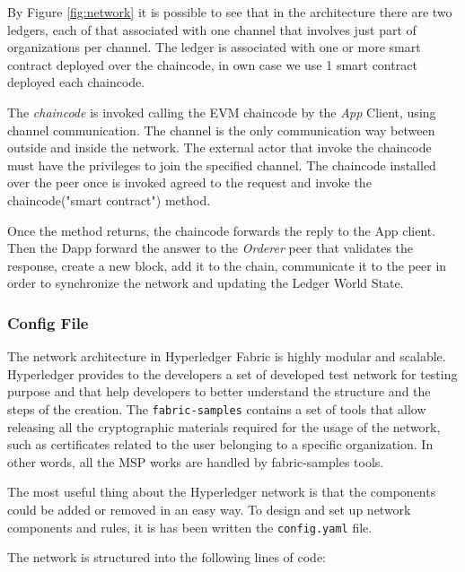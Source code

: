 By Figure \ref{fig:network} it is possible to see that in the architecture there are two ledgers, each of that 
associated with one channel that involves just part of organizations per channel. The ledger is associated with 
one or more smart contract deployed over the chaincode, in own case we use 1 smart contract deployed each chaincode. 

The \textit{chaincode} is invoked calling the EVM chaincode by the \textit{App} Client, using channel communication.
The channel is the only communication way between outside and inside the network. The external actor that invoke the chaincode
must have the privileges to join the specified channel. 
The chaincode installed over the peer once is invoked agreed to the request and invoke the chaincode("smart contract")
method. 

Once the method returns, the chaincode forwards the reply to the App client. Then the Dapp forward the
answer to the \textit{Orderer} peer that validates the response, create a new block, add it to the chain,
communicate it to the peer in order to synchronize the network and updating the Ledger World State.

\subsubsection{Config File}

The network architecture in Hyperledger Fabric is highly modular and scalable. Hyperledger provides to the developers a set of developed 
test network\cite{fabric-sample} for testing purpose and that help developers to better understand
the structure and the steps of the creation. The \texttt{fabric-samples} contains a set of tools that allow releasing all the cryptographic
materials required for the usage of the network, such as certificates related to the user belonging to a specific organization.
In other words, all the MSP works are handled by fabric-samples tools. 
\bigskip

The most useful thing about the Hyperledger network is that the components could be added or removed in an easy way.
To design and set up network components and rules, it is has been written the \texttt{config.yaml} file.

\bigskip
The network is structured into the following lines of code:

